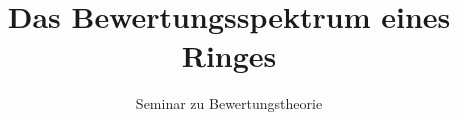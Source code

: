 \documentclass{scrartcl}
\title{Das Bewertungsspektrum eines Ringes}
\subtitle{Seminar zu Bewertungstheorie}
\date{}
\author{}
\begin{document}
\maketitle
\vspace{-1cm}


\newpage
\begin{appendices}

\end{appendices}
\end{document}
